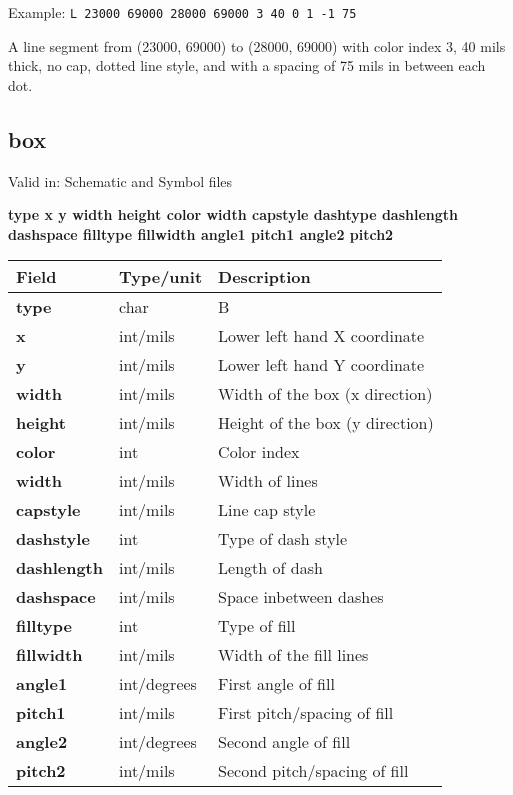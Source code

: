 \documentclass{article}
\begin{document}
Example:\newline
{\tt L 23000 69000 28000 69000 3 40 0 1 -1 75}

A line segment from (23000, 69000) to (28000, 69000) with color index 3, 
40 mils thick, no cap, dotted line style, and with a spacing of 75 mils 
in between each dot.


\subsection{box}

Valid in: Schematic and Symbol files

{\bf type x y width height color width capstyle dashtype dashlength dashspace filltype fillwidth angle1 pitch1 angle2 pitch2 }

\begin{table}[h]
\begin{tabular}{|l|l|l|} \hline
Field 		& Type/unit 	& Description \\ \hline 
\hline
{\bf type} 	& char		& B \\ \hline
{\bf x} 	& int/mils	& Lower left hand X coordinate \\ \hline 
{\bf y} 	& int/mils	& Lower left hand Y coordinate \\ \hline
{\bf width} 	& int/mils 	& Width of the box (x direction) \\ \hline
{\bf height} 	& int/mils 	& Height of the box (y direction) \\ \hline
{\bf color} 	& int 		& Color index \\ \hline
{\bf width} 	& int/mils 	& Width of lines \\ \hline
{\bf capstyle} 	& int/mils	& Line cap style \\ \hline
{\bf dashstyle} & int 		& Type of dash style \\ \hline
{\bf dashlength}& int/mils	& Length of dash \\ \hline
{\bf dashspace} & int/mils	& Space inbetween dashes \\ \hline
{\bf filltype}  & int		& Type of fill \\ \hline
{\bf fillwidth} & int/mils	& Width of the fill lines \\ \hline
{\bf angle1} 	& int/degrees	& First angle of fill \\ \hline
{\bf pitch1} 	& int/mils	& First pitch/spacing of fill \\ \hline
{\bf angle2} 	& int/degrees 	& Second angle of fill \\ \hline
{\bf pitch2} 	& int/mils	& Second pitch/spacing of fill \\ \hline
\end{tabular}
\end{table}
\end{document}
